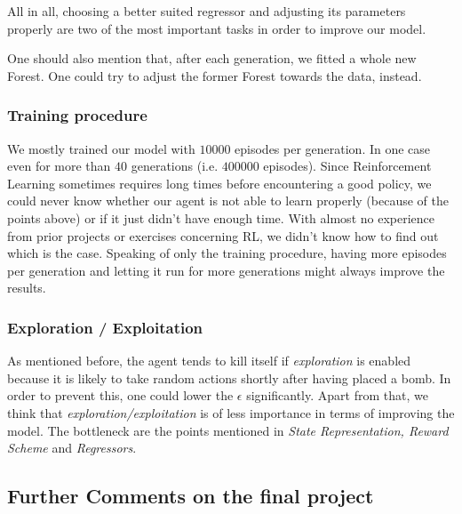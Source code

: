 All in all, choosing a better suited regressor and adjusting its parameters properly are two of the most important tasks in order to improve our model.\par

One should also mention that, after each generation, we fitted a whole new Forest. One could try to adjust the former Forest towards the data, instead.

\subsubsection{Training procedure}
We mostly trained our model with $10000$ episodes per generation. In one case even for more than $40$ generations (i.e. $400000$ episodes). Since Reinforcement Learning sometimes requires long times before encountering a good policy, we could never know whether our agent is not able to learn properly (because of the points above) or if it just didn't have enough time. With almost no experience from prior projects or exercises concerning RL, we didn't know how to find out which is the case. Speaking of only the training procedure, having more episodes per generation and letting it run for more generations might always improve the results.

\subsubsection{Exploration / Exploitation}
As mentioned before, the agent tends to kill itself if \textit{exploration} is enabled because it is likely to take random actions shortly after having placed a bomb. In order to prevent this, one could lower the $\epsilon$ significantly. Apart from that, we think that \textit{exploration/exploitation} is of less importance in terms of improving the model. The bottleneck are the points mentioned in \textit{State Representation, Reward Scheme} and \textit{Regressors}. 

\subsection{Further Comments on the final project}
